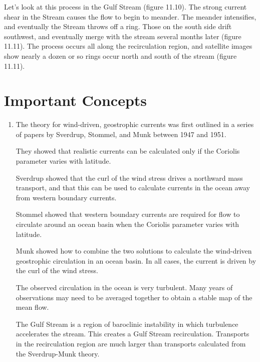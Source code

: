 Let's look at this process in the Gulf Stream (figure 11.10). The
strong current shear in the Stream causes the flow to begin to
meander. The meander intensifies, and eventually the Stream throws off
a ring. Those on the south side drift southwest, and eventually merge
with the stream several months later (figure 11.11). The process
occurs all along the recirculation region, and satellite images show
nearly a dozen or so rings occur north and south of the stream (figure 11.11).

\section{Important Concepts}
\begin{enumerate}

\item The theory for wind-driven, geostrophic
currents was first
outlined in a series of papers by Sverdrup, Stommel, and Munk
between 1947 and 1951.

\vitem They showed that realistic currents can be calculated only if
the Coriolis parameter varies with latitude.

\vitem Sverdrup showed that the curl of the wind stress drives a northward mass
transport, and that this can be used to
calculate currents in the ocean away from western boundary currents.

\vitem Stommel showed that western boundary currents are required for
flow to circulate around an ocean basin when the Coriolis
parameter varies with latitude.

\vitem Munk showed how to combine the two solutions to calculate the
wind-driven geostrophic circulation in an ocean basin. In all cases, the current is driven
by the curl of the wind stress.

\vitem The observed circulation in the ocean is very turbulent. Many
years of observations may need to be averaged together to obtain a
stable map of the mean flow.

\vitem The Gulf Stream is a region of baroclinic
instability in which turbulence
accelerates the stream. This creates a Gulf Stream
recirculation. Transports in the recirculation region are much larger
than transports calculated from the
Sverdrup-Munk theory.
\end{enumerate}

